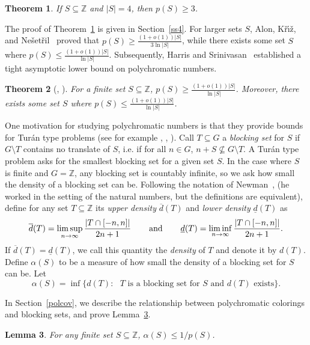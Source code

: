 \documentclass[12pt]{article}
\newtheorem{theorem}{Theorem}
\newtheorem{lemma}[theorem]{Lemma}
\newcommand{\Z}{\ensuremath{\mathbb Z}}
\begin{document}
\begin{theorem}\label{ps34}
If $S \subseteq \Z$ and $|S|=4$, then $p(S) \ge 3$.
\end{theorem}

The proof of Theorem~\ref{ps34} is given in Section~\ref{ss4}.  For larger sets $S$, Alon, 
K{\v{r}}{\'\i}{\v{z}}, and Ne\v{s}et\v{r}il~\cite{AKN95} proved that $p(S) \ge \frac{(1+o(1))|S|}{3\ln|S|}$, while there exists some set $S$ where $p(S) \le \frac{(1+o(1))|S|}{\ln|S|}$. Subsequently, Harris and Srinivasan~\cite{HS16} established a tight asymptotic lower bound on polychromatic numbers.

\begin{theorem}[\cite{AKN95}, \cite{HS16}]\label{Harris}
For a finite set $S \subseteq \Z$, $p(S) \ge \frac{(1+o(1))|S|}{\ln|S|}$. Moreover,  there exists some set $S$ where $p(S) \le \frac{(1+o(1))|S|}{\ln|S|}$.
\end{theorem}

One motivation for studying polychromatic numbers is that they provide bounds for Tur\'an type problems (see for example \cite{AKS07}, \cite{Off09}, \cite{OS11}). Call $T \subseteq G$ a \textit{blocking set} for $S$ if $G \setminus T$ contains no translate of $S$, i.e. if for all $n \in G$, $n+S\nsubseteq G\setminus T$. A Tur\'an type problem asks for the smallest blocking set for a given set $S$. In the case where $S$ is finite and $G=\Z$, any blocking set is countably infinite, so we ask how small the density of a blocking set can be. Following the notation of Newman~\cite{New67}, (he worked in the setting of the natural numbers, but the definitions are equivalent), define for any set $T \subseteq \Z$ its \textit{upper density} $\overline{d}(T)$ and \textit{lower density} $\underline{d}(T)$ as 
\[\overline{d}(T) = \limsup_{n\rightarrow \infty} \frac{|T \cap [-n,n]|}{2n+1} \hspace{.25in} \text{ and } \hspace{.25in} \underline{d}(T) = \liminf_{n\rightarrow \infty} \frac{|T \cap [-n,n]|}{2n+1}. \]
If $\overline{d}(T)=\underline{d}(T)$, we call this quantity the \textit{density} of $T$ and denote it by $d(T)$. Define $\alpha(S)$ to be a measure of how small the density of a blocking set for $S$ can be. Let
\[\alpha(S) = \inf\{d(T):\text{ $T$ is a blocking set for $S$ and $d(T)$ exists}\}.\]

In Section~\ref{polcov}, we describe the relationship between polychromatic colorings and blocking sets, and prove Lemma~\ref{csps}.
\begin{lemma}\label{csps}
For any finite set $S \subseteq \Z$, $\alpha(S) \le 1/p(S)$.
\end{lemma}
\end{document}
